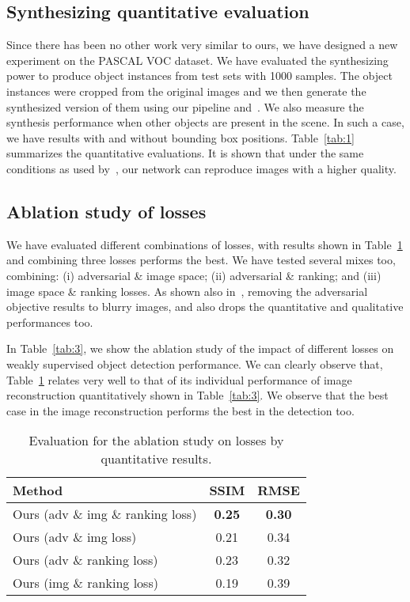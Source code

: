\documentclass[runningheads]{llncs}
\begin{document}
\subsection{Synthesizing quantitative evaluation}

Since there has been no other work very similar to ours, we have designed a new experiment on the PASCAL VOC dataset. We have evaluated the synthesizing power to produce object instances from test sets with 1000 samples. The object instances were cropped from the original images and we then generate the synthesized version of them using our pipeline and~\cite{dosovitskiy2}. We also measure the synthesis performance when other objects are present in the scene. In such a case, we have results with and without bounding box positions. Table~\ref{tab:1} summarizes the quantitative evaluations. It is shown that under the same conditions as used by~\cite{dosovitskiy2}, our network can reproduce images with a higher quality.

\subsection{Ablation study of losses}
We have evaluated different combinations of losses, with results shown in Table~\ref{tab:2} and combining three losses performs the best. We have tested several  mixes too, combining: (i) adversarial \& image space; (ii) adversarial \& ranking; and (iii) image space \& ranking losses. As shown also in~\cite{dosovitskiy2,nguyen}, removing the adversarial objective results to blurry images, and also drops the quantitative and qualitative performances too.

In Table~\ref{tab:3}, we show the ablation study of the impact of different losses on weakly supervised object detection performance. We can clearly observe that, Table~\ref{tab:2} relates very well to that of its individual performance of image reconstruction quantitatively shown in Table~\ref{tab:3}. We observe that the best case in the image reconstruction performs the best in the detection too.

\begin{table}[t]
{\small
\tabcolsep=0.3cm
\caption{Evaluation for the ablation study on losses by quantitative results.}
 \label{tab:2}
\begin{center}
\begin{tabular}{lcc}
\toprule
Method & SSIM & RMSE \\
\midrule
Ours (adv \& img \& ranking loss) & \textbf{0.25} & \textbf{0.30}   \\
Ours (adv \& img loss) & 0.21 & 0.34   \\
Ours (adv \& ranking loss) & 0.23 & 0.32   \\
Ours (img \& ranking loss) & 0.19 & 0.39   \\
\bottomrule
\end{tabular}
\end{center}}


\end{table}
\end{document}
